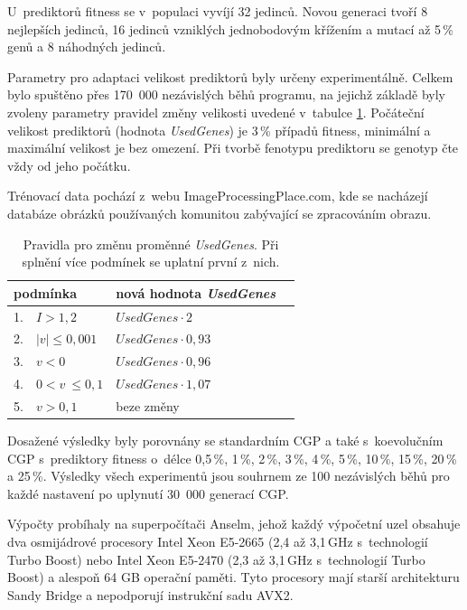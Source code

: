 \documentclass[czech]{ExcelAtFIT} %
\begin{document}
U~prediktorů fitness se v~populaci vyvíjí 32 jedinců. Novou generaci tvoří 8 nejlepších jedinců, 16 jedinců vzniklých jednobodovým křížením a mutací až 5\,\% genů a 8 náhodných jedinců.

Parametry pro adaptaci velikost prediktorů byly určeny experimentálně. Celkem bylo spuštěno přes 170~000 nezávislých běhů programu, na jejichž základě byly zvoleny parametry pravidel změny velikosti uvedené v~tabulce \ref{table:rules}. Počáteční velikost prediktorů (hodnota \textit{UsedGenes}) je 3\,\% případů fitness, minimální a maximální velikost je bez omezení. Při tvorbě fenotypu prediktoru se ge\-notyp čte vždy od jeho počátku.

Trénovací data pochází z~webu ImageProcessingPlace.com, kde se nacházejí databáze obrázků po\-uží\-vaných komunitou zabývající se zpracováním obrazu.

\begin{table}[hbt]
    \vskip6pt
    \caption{Pravidla pro změnu proměnné \textit{UsedGenes}. Při splnění více podmínek se uplatní první z~nich.}
    \label{table:rules}
    \centering
    \small
    \renewcommand{\arraystretch}{1.1}
    \begin{tabular}{llll}
        \toprule
        \multicolumn{2}{l}{podmínka}      &  nová hodnota \textit{UsedGenes}  \\
        \midrule
        1. &  $I > 1,2$                   &  $\mathit{UsedGenes} \cdot 2    $     \\
        2. &  $\left|v\right| \leq 0,001$ &  $\mathit{UsedGenes} \cdot 0,93 $  \\
        3. &  $v < 0$                     &  $\mathit{UsedGenes} \cdot 0,96 $  \\
        4. &  $0 < v~\leq 0,1$            &  $\mathit{UsedGenes} \cdot 1,07 $  \\
        5. &  $v > 0,1$                   &  beze změny             \\
        \bottomrule
    \end{tabular}
\end{table}

Dosažené výsledky byly porovnány se standardním CGP a také s~koevolučním CGP s~prediktory fitness o~délce 0,5\,\%, 1\,\%, 2\,\%, 3\,\%, 4\,\%, 5\,\%, 10\,\%, 15\,\%, 20\,\% a 25\,\%. Výsledky všech experimentů jsou souhrnem ze 100 nezávislých běhů pro každé nastavení po uplynutí 30~000 generací CGP.

Výpočty probíhaly na superpočítači Anselm, \mbox{jehož} každý výpočetní uzel obsahuje dva osmijádrové procesory Intel Xeon E5-2665 (2,4 až 3,1\,GHz s~technologií Turbo Boost) nebo Intel Xeon E5-2470 (2,3 až 3,1\,GHz s~technologií Turbo Boost) a alespoň 64 GB operační paměti. Tyto procesory mají starší architekturu Sandy Bridge a nepodporují instrukční sadu AVX2.
\end{document}
